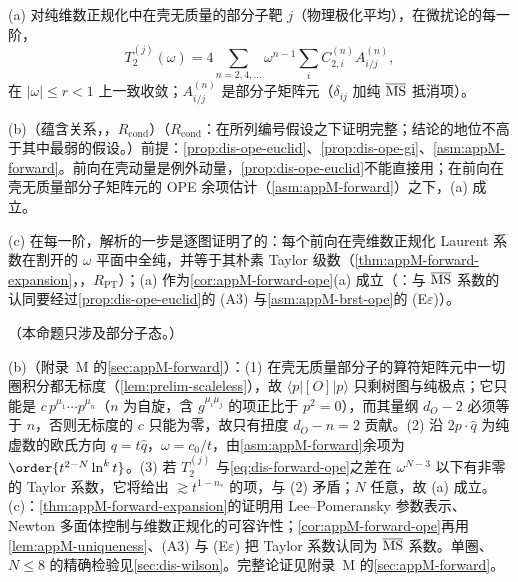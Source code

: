 \begin{proposition}\label{prop:dis-ope-forward}
(a) 对纯维数正规化中在壳无质量的部分子靶 $j$（物理极化平均），在微扰论的每一阶，
\begin{equation}\label{eq:dis-forward-ope}
T_2^{(j)}(\omega)=4\sum_{n=2,4,\dots}\omega^{n-1}\sum_iC^{(n)}_{2,i}A^{(n)}_{i/j},
\end{equation}
在 $|\omega|\le r<1$ 上一致收敛；$A^{(n)}_{i/j}$ 是部分子矩阵元（$\delta_{ij}$ 加纯 $\overline{\rm MS}$ 抵消项）。
\par
(b)（蕴含关系，\tagR，$R_{\mathrm{cond}}$）（$R_{\mathrm{cond}}$：在所列编号假设之下证明完整；结论的地位不高于其中最弱的假设。）前提：\cref{prop:dis-ope-euclid}、\cref{prop:dis-ope-gi}、\cref{asm:appM-forward}。前向在壳动量是例外动量，\cref{prop:dis-ope-euclid}不能直接用；在前向在壳无质量部分子矩阵元的 OPE 余项估计（\cref{asm:appM-forward}）之下，(a) 成立。
\par
(c) 在每一阶，解析的一步是逐图证明了的：每个前向在壳维数正规化 Laurent 系数在割开的 $\omega$ 平面中全纯，并等于其朴素 Taylor 级数（\cref{thm:appM-forward-expansion}，\tagR，$R_{\mathrm{PT}}$）；(a) 作为\cref{cor:appM-forward-ope}(a) 成立（\tagA：与 $\overline{\rm MS}$ 系数的认同要经过\cref{prop:dis-ope-euclid}的 (A3) 与\cref{asm:appM-brst-ope}的 (E$\varepsilon$)）。
\par
（本命题只涉及部分子态。）
\end{proposition}

\begin{proofsketch}
(b)（附录~M 的\cref{sec:appM-forward}）：(1) 在壳无质量部分子的算符矩阵元中一切圈积分都无标度（\cref{lem:prelim-scaleless}），故 $\langle p|[O]|p\rangle$ 只剩树图与纯极点；它只能是 $c\,p^{\mu_1}\cdots p^{\mu_n}$（$n$ 为自旋，含 $g^{\mu_i\mu_j}$ 的项正比于 $p^2=0$），而其量纲 $d_O-2$ 必须等于 $n$，否则无标度的 $c$ 只能为零，故只有扭度 $d_O-n=2$ 贡献。(2) 沿 $2p\cdot\hat q$ 为纯虚数的欧氏方向 $q=t\hat q$，$\omega=c_0/t$，由\cref{asm:appM-forward}余项为 $\order{t^{2-N}\ln^kt}$。(3) 若 $T_2^{(j)}$ 与\cref{eq:dis-forward-ope}之差在 $\omega^{N-3}$ 以下有非零的 Taylor 系数，它将给出 $\gtrsim t^{1-n_*}$ 的项，与 (2) 矛盾；$N$ 任意，故 (a) 成立。(c)：\cref{thm:appM-forward-expansion}的证明用 Lee--Pomeransky 参数表示、Newton 多面体控制与维数正规化的可容许性；\cref{cor:appM-forward-ope}再用\cref{lem:appM-uniqueness}、(A3) 与 (E$\varepsilon$) 把 Taylor 系数认同为 $\overline{\rm MS}$ 系数。单圈、$N\le8$ 的精确检验见\cref{sec:dis-wilson}。完整论证见附录~M 的\cref{sec:appM-forward}。
\end{proofsketch}

